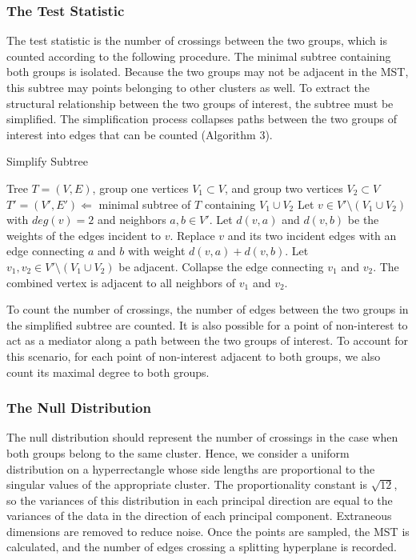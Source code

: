 \documentclass{article}
\begin{document}
{\subsubsection{The Test Statistic}
The test statistic is the number of crossings between the two groups, which is counted according to the following procedure. The minimal subtree containing both groups is isolated. Because the two groups may not be adjacent in the MST, this subtree may points belonging to other clusters as well. To extract the structural relationship between the two groups of interest, the subtree must be simplified. The simplification process collapses paths between the two groups of interest into edges that can be counted (Algorithm 3).

\begin{algorithm}[t]
\caption{Simplify Subtree}\label{algo3}
\begin{algorithmic}[3]
\Require Tree $T = (V,E)$, group one vertices $V_1 \subset V$, and group two vertices $V_2 \subset V$
\State $T' = (V', E') \Leftarrow$ minimal subtree of $T$ containing $V_1 \cup V_2$
\Repeat
	\State Let $v \in V' \setminus (V_1 \cup V_2)$ with $deg(v) = 2$ and neighbors $a, b \in V'$. Let $d(v, a)$ and $d(v, b)$ be the weights of the edges incident to $v$.
	\State Replace $v$ and its two incident edges with an edge connecting $a$ and $b$ with weight $d(v, a) + d(v, b)$.
\Repeat
	\State Let $v_1, v_2 \in V' \setminus (V_1 \cup V_2)$ be adjacent.
	\State Collapse the edge connecting $v_1$ and $v_2$. The combined vertex is adjacent to all neighbors of $v_1$ and $v_2$.
\end{algorithmic}
\end{algorithm}

To count the number of crossings, the number of edges between the two groups in the simplified subtree are counted. It is also possible for a point of non-interest to act as a mediator along a path between the two groups of interest. To account for this scenario, for each point of non-interest adjacent to both groups, we also count its maximal degree to both groups.

\subsubsection{The Null Distribution}
The null distribution should represent the number of crossings in the case when both groups belong to the same cluster. Hence, we consider a uniform distribution on a hyperrectangle whose side lengths are proportional to the singular values of the appropriate cluster. The proportionality constant is $\sqrt{12}$, so the variances of this distribution in each principal direction are equal to the variances of the data in the direction of each principal component. Extraneous dimensions are removed to reduce noise. Once the points are sampled, the MST is calculated, and the number of edges crossing a splitting hyperplane is recorded.

}
\end{document}
